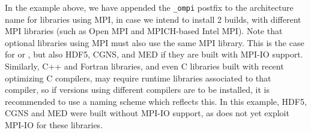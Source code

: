 \documentclass[a4paper,10pt,twoside]{csshortdoc}
\begin{document}

In the example above, we have appended the \texttt{\_ompi} postfix
to the architecture name for libraries using MPI, in case we intend
to install 2 builds, with different MPI libraries (such as Open MPI and MPICH-based Intel MPI).
Note that optional libraries using MPI must also use the same MPI
library. This is the case for \ptscotch or \parmetis, but also HDF5,
CGNS, and MED if they are built with MPI-IO support.
Similarly, C++ and Fortran libraries, and even C libraries built
with recent optimizing C compilers, may require runtime libraries
associated to that compiler, so if versions using different compilers
are to be installed, it is recommended to use a naming scheme
which reflects this.
In this example, HDF5, CGNS and MED were built without MPI-IO support,
as \CS does not yet exploit MPI-IO for these libraries.
\end{document}
